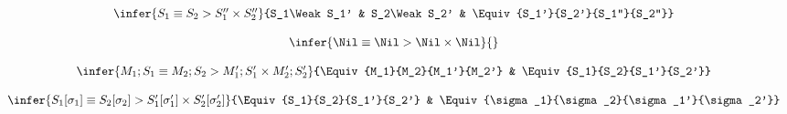 \bigskip 
{}
\bigskip 

$$
\begin{array}{c}
\infer{\Equiv{S_1}{S_2}{S_1''}{S_2''}}{S_1\Weak S_1' & S_2\Weak S_2' & \Equiv{S_1'}{S_2'}{S_1''}{S_2''}}\\\\
\infer{\Equiv{\Nil}{\Nil}{\Nil}{\Nil}}{}\\\\
\infer{\Equiv{M_1;S_1}{M_2;S_2}{M_1';S_1'}{M_2';S_2'}}{\Equiv{M_1}{M_2}{M_1'}{M_2'} & \Equiv{S_1}{S_2}{S_1'}{S_2'}} \\\\
\infer{\Equiv{S_1[\sigma_1]}{S_2[\sigma_2]}{S_1'[\sigma_1']}{S_2'[\sigma_2']}}{\Equiv{S_1}{S_2}{S_1'}{S_2'} & \Equiv{\sigma_1}{\sigma_2}{\sigma_1'}{\sigma_2'}} \\\\
\end{array} 
$$
